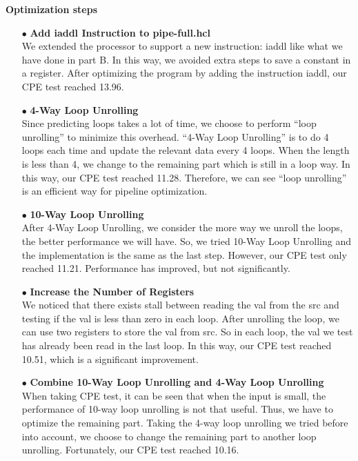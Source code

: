 \documentclass{article}
\begin{document}
{\normalsize\bfseries  Optimization steps}
\begin{itemize}
\item[$\bullet$]{\bfseries Add iaddl Instruction to {\ttfamily pipe-full.hcl}}\\
We extended the processor to support a new instruction: {\ttfamily iaddl} like what we have done in part B. In this way, we avoided extra steps to save a constant in a register. After optimizing the program by adding the instruction iaddl, our CPE test reached 13.96.
\item[$\bullet$]{\bfseries 4-Way Loop Unrolling}\\
Since predicting loops takes a lot of time, we choose to perform “loop unrolling” to minimize this overhead. “4-Way Loop Unrolling” is to do 4 loops each time and update the relevant data every 4 loops. When the length is less than 4, we change to the remaining part which is still in a loop way. In this way, our CPE test reached 11.28. Therefore, we can see “loop unrolling” is an efficient way for pipeline optimization.
\item[$\bullet$]{\bfseries 10-Way Loop Unrolling}\\
After 4-Way Loop Unrolling, we consider the more way we unroll the loops, the better performance we will have. So, we tried 10-Way Loop Unrolling and the implementation is the same as the last step. However, our CPE test only reached 11.21. Performance has improved, but not significantly.
\item[$\bullet$]{\bfseries Increase the Number of Registers}\\
We noticed that there exists stall between reading the val from the src and testing if the val is less than zero in each loop. After unrolling the loop, we can use two registers to store the val from src. So in each loop, the val we test has already been read in the last loop. In this way, our CPE test reached 10.51, which is a significant improvement. 
\item[$\bullet$]{\bfseries Combine 10-Way Loop Unrolling and 4-Way Loop Unrolling}\\
When taking CPE test, it can be seen that when the input is small, the performance of 10-way loop unrolling is not that useful. Thus, we have to optimize the remaining part. Taking the 4-way loop unrolling we tried before into account, we choose to change the remaining part to another loop unrolling. Fortunately, our CPE test reached 10.16.
\end{itemize}
\end{document}
